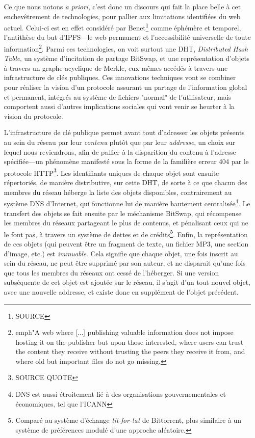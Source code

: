 \documentclass{article}
\begin{document}
Ce que nous notons \emph{a priori}, c'est donc un discours qui fait la place belle à cet enchevêtrement de technologies, pour pallier aux limitations identifiées du web actuel. Celui-ci est en effet considéré par Benet\footnote{SOURCE} comme éphémère et temporel, l'antithèse du but d'IPFS—le web permanent et l'accessibilité universelle de toute information\footnote{emph{"A web where [...] publishing valuable information does not impose hosting it on the publisher but upon those interested, where users can trust the content they receive without trusting the peers they receive it from, and where old but important files do not go missing.}\cite{benet_ipfs_2014}}. Parmi ces technologies, on voit surtout une DHT, \emph{Distributed Hash Table}, un système d'incitation de partage BitSwap, et une représentation d'objets à travers un graphe acyclique de Merkle, eux-mêmes accédés à travers une infrastructure de clés publiques. Ces innovations techniques vont se combiner pour réaliser la vision d'un protocole assurant un partage de l'information global et permanent, intégrés au système de fichiers "normal" de l'utilisateur, mais comportent aussi d'autres implications sociales qui vont venir se heurter à la vision du protocole.

L'infrastructure de clé publique permet avant tout d'adresser les objets présents au sein du réseau par leur \emph{contenu} plutôt que par leur \emph{addresse}, un choix sur lequel nous reviendrons, afin de pallier à la disparition du contenu à l'adresse spécifiée—un phénomène manifesté sous la forme de la familière erreur 404 par le protocole HTTP\footnote{SOURCE QUOTE}. Les identifiants uniques de chaque objet sont ensuite répertoriés, de manière distributive, sur cette DHT, de sorte à ce que chacun des membres du réseau héberge la liste des objets disponibles, contrairement au système DNS d'Internet, qui fonctionne lui de manière hautement centralisée\footnote{DNS est aussi étroitement lié à des organisations gouvernementales et économiques, tel que l'ICANN}. Le transfert des objets se fait ensuite par le méchanisme BitSwap, qui récompense les membres du réseaux partageant le plus de contenus, et pénalisant ceux qui ne le font pas, à travers un système de dettes et de crédits\footnote{Comparé au système d'échange \emph{tit-for-tat} de Bittorrent, plus similaire à un système de préférences modulé d'une approche aléatoire.}. Enfin, la représentation de ces objets (qui peuvent être un fragment de texte, un fichier MP3, une section d'image, etc.) est \emph{immuable}. Cela signifie que chaque objet, une fois inscrit au sein du réseau, ne peut être supprimé par son auteur, et ne disparait qu'une fois que tous les membres du réseaux ont cessé de l'héberger. Si une version subséquente de cet objet est ajoutée sur le réseau, il s'agit d'un tout nouvel objet, avec une nouvelle addresse, et existe donc en supplément de l'objet précédent.
\end{document}
